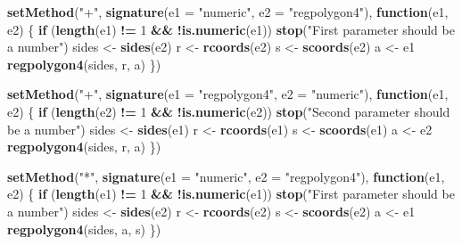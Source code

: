 \documentclass[]{article}
\newenvironment{Shaded}{\begin{snugshade}}{\end{snugshade}}
\newcommand{\KeywordTok}[1]{\textcolor[rgb]{0.13,0.29,0.53}{\textbf{#1}}}
\newcommand{\DataTypeTok}[1]{\textcolor[rgb]{0.13,0.29,0.53}{#1}}
\newcommand{\DecValTok}[1]{\textcolor[rgb]{0.00,0.00,0.81}{#1}}
\newcommand{\StringTok}[1]{\textcolor[rgb]{0.31,0.60,0.02}{#1}}
\newcommand{\ControlFlowTok}[1]{\textcolor[rgb]{0.13,0.29,0.53}{\textbf{#1}}}
\newcommand{\OperatorTok}[1]{\textcolor[rgb]{0.81,0.36,0.00}{\textbf{#1}}}
\newcommand{\NormalTok}[1]{#1}
\begin{document}
\begin{Shaded}
\begin{Highlighting}[]
\KeywordTok{setMethod}\NormalTok{(}\StringTok{"+"}\NormalTok{, }\KeywordTok{signature}\NormalTok{(}\DataTypeTok{e1 =} \StringTok{"numeric"}\NormalTok{, }\DataTypeTok{e2 =} \StringTok{"regpolygon4"}\NormalTok{), }\ControlFlowTok{function}\NormalTok{(e1, e2) \{ }
  \ControlFlowTok{if}\NormalTok{ (}\KeywordTok{length}\NormalTok{(e1) }\OperatorTok{!=}\StringTok{ }\DecValTok{1} \OperatorTok{&&}\StringTok{ }\OperatorTok{!}\KeywordTok{is.numeric}\NormalTok{(e1)) }
      \KeywordTok{stop}\NormalTok{(}\StringTok{"First parameter should be a number"}\NormalTok{) }
\NormalTok{    sides <-}\StringTok{ }\KeywordTok{sides}\NormalTok{(e2)}
\NormalTok{    r <-}\StringTok{ }\KeywordTok{rcoords}\NormalTok{(e2)}
\NormalTok{    s <-}\StringTok{ }\KeywordTok{scoords}\NormalTok{(e2)}
\NormalTok{    a <-}\StringTok{ }\NormalTok{e1 }
  \KeywordTok{regpolygon4}\NormalTok{(sides, r, a) }
\NormalTok{\})}

\KeywordTok{setMethod}\NormalTok{(}\StringTok{"+"}\NormalTok{, }\KeywordTok{signature}\NormalTok{(}\DataTypeTok{e1 =} \StringTok{"regpolygon4"}\NormalTok{, }\DataTypeTok{e2 =} \StringTok{"numeric"}\NormalTok{), }\ControlFlowTok{function}\NormalTok{(e1, e2) \{ }
  \ControlFlowTok{if}\NormalTok{ (}\KeywordTok{length}\NormalTok{(e2) }\OperatorTok{!=}\StringTok{ }\DecValTok{1} \OperatorTok{&&}\StringTok{ }\OperatorTok{!}\KeywordTok{is.numeric}\NormalTok{(e2)) }
      \KeywordTok{stop}\NormalTok{(}\StringTok{"Second parameter should be a number"}\NormalTok{) }
\NormalTok{    sides <-}\StringTok{ }\KeywordTok{sides}\NormalTok{(e1)}
\NormalTok{    r <-}\StringTok{ }\KeywordTok{rcoords}\NormalTok{(e1)}
\NormalTok{    s <-}\StringTok{ }\KeywordTok{scoords}\NormalTok{(e1)}
\NormalTok{    a <-}\StringTok{ }\NormalTok{e2 }
  \KeywordTok{regpolygon4}\NormalTok{(sides, r, a) }
\NormalTok{\})}

\KeywordTok{setMethod}\NormalTok{(}\StringTok{"*"}\NormalTok{, }\KeywordTok{signature}\NormalTok{(}\DataTypeTok{e1 =} \StringTok{"numeric"}\NormalTok{, }\DataTypeTok{e2 =} \StringTok{"regpolygon4"}\NormalTok{), }\ControlFlowTok{function}\NormalTok{(e1, e2) \{ }
  \ControlFlowTok{if}\NormalTok{ (}\KeywordTok{length}\NormalTok{(e1) }\OperatorTok{!=}\StringTok{ }\DecValTok{1} \OperatorTok{&&}\StringTok{ }\OperatorTok{!}\KeywordTok{is.numeric}\NormalTok{(e1)) }
      \KeywordTok{stop}\NormalTok{(}\StringTok{"First parameter should be a number"}\NormalTok{) }
\NormalTok{    sides <-}\StringTok{ }\KeywordTok{sides}\NormalTok{(e2)}
\NormalTok{    r <-}\StringTok{ }\KeywordTok{rcoords}\NormalTok{(e2)}
\NormalTok{    s <-}\StringTok{ }\KeywordTok{scoords}\NormalTok{(e2)}
\NormalTok{    a <-}\StringTok{ }\NormalTok{e1 }
  \KeywordTok{regpolygon4}\NormalTok{(sides, a, s) }
\NormalTok{\})}


\end{Highlighting}
\end{Shaded}
\end{document}
